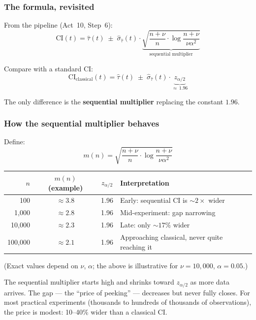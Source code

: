 \documentclass[12pt, a4paper]{article}
\begin{document}
\subsubsection*{The formula, revisited}

From the pipeline (Act~10, Step~6):
\[
  \boxed{\text{CI}(t) = \hat{\tau}(t) \;\pm\;
  \hat{\sigma}_{\hat{\tau}}(t) \cdot
  \underbrace{\sqrt{\frac{n + \nu}{n} \cdot
  \log\!\frac{n + \nu}{\nu \alpha^2}}}_{\text{sequential multiplier}}}
\]

Compare with a standard CI:
\[
  \text{CI}_{\text{classical}}(t) = \hat{\tau}(t) \;\pm\;
  \hat{\sigma}_{\hat{\tau}}(t) \cdot
  \underbrace{z_{\alpha/2}}_{\approx\,1.96}
\]

The only difference is the \textbf{sequential multiplier} replacing the
constant $1.96$.

\subsubsection*{How the sequential multiplier behaves}

Define:
\[
  m(n) = \sqrt{\frac{n + \nu}{n} \cdot \log\frac{n + \nu}{\nu \alpha^2}}
\]

\begin{center}
\renewcommand{\arraystretch}{1.3}
\begin{tabular}{@{} r c c l @{}}
\toprule
$n$ & $m(n)$ (example) & $z_{\alpha/2}$ & \textbf{Interpretation} \\
\midrule
100 & $\approx 3.8$ & 1.96 & Early: sequential CI is $\sim\!2\times$ wider \\
1{,}000 & $\approx 2.8$ & 1.96 & Mid-experiment: gap narrowing \\
10{,}000 & $\approx 2.3$ & 1.96 & Late: only $\sim\!17\%$ wider \\
100{,}000 & $\approx 2.1$ & 1.96 & Approaching classical, never quite reaching it \\
\bottomrule
\end{tabular}
\end{center}

(Exact values depend on $\nu$, $\alpha$; the above is illustrative for
$\nu = 10{,}000$, $\alpha = 0.05$.)

\begin{plainlanguage}
The sequential multiplier starts high and shrinks toward $z_{\alpha/2}$ as
more data arrives.  The gap --- the ``price of peeking'' --- decreases but
never fully closes.  For most practical experiments (thousands to hundreds of
thousands of observations), the price is modest: 10--40\% wider than a
classical CI.
\end{plainlanguage}
\end{document}
